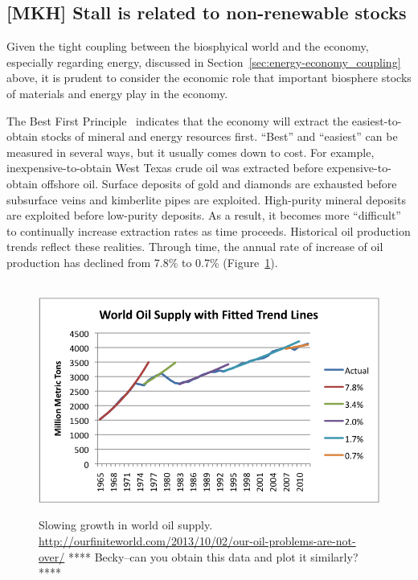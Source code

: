 \subsection{[MKH] Stall is related to non-renewable stocks}
\label{sec:stall_non-renewable_stocks}

Given the tight coupling between the biosphyical world and the economy,
especially regarding energy,
discussed in Section~\ref{sec:energy-economy_coupling} above,
it is prudent to consider the economic role that important biosphere stocks
of materials and energy play in the economy.

The Best First Principle~\cite{Cleveland:2008aa}
indicates that the economy will extract the easiest-to-obtain 
stocks of mineral and energy resources first.
``Best'' and ``easiest'' can be measured in several ways, 
but it usually comes down to cost.
For example, inexpensive-to-obtain West Texas crude oil was extracted
before expensive-to-obtain offshore oil. 
Surface deposits of gold and diamonds are exhausted before subsurface
veins and kimberlite pipes are exploited.
High-purity mineral deposits are exploited before low-purity deposits.
As a result, it becomes more ``difficult'' to continually increase
extraction rates as time proceeds.
Historical oil production trends reflect these realities.
Through time, the annual rate of increase of oil production
has declined from 7.8\% to 0.7\% (Figure~\ref{fig:oil_production}).

\begin{figure}[!ht]
\centering\
\includegraphics[width=\linewidth]{Part_0/Chapter_Introduction/images/growth-in-world-oil-supply.png}
\caption[World Oil Supply]{Slowing growth in world oil supply.
\url{http://ourfiniteworld.com/2013/10/02/our-oil-problems-are-not-over/}
**** Becky--can you obtain this data and plot it similarly? ****
}
\label{fig:oil_production}
\end{figure}

